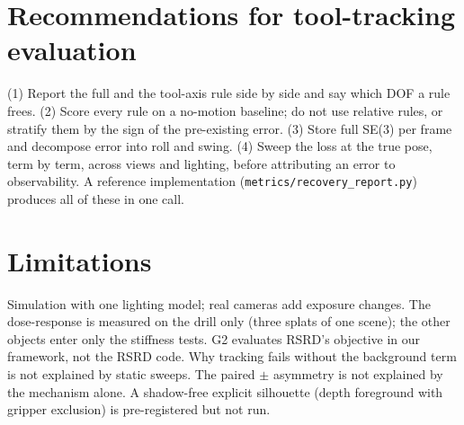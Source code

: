 \documentclass[conference]{IEEEtran}
\begin{document}
\section{Recommendations for tool-tracking evaluation}\label{sec:recs}
(1) Report the full and the tool-axis rule side by side and say which DOF a rule frees. (2) Score every rule on a
no-motion baseline; do not use relative rules, or stratify them by the sign of the pre-existing error. (3) Store
full SE(3) per frame and decompose error into roll and swing. (4) Sweep the loss at the true pose, term by term,
across views and lighting, before attributing an error to observability. A reference implementation
(\texttt{metrics/recovery\_report.py}) produces all of these in one call.

\section{Limitations}
Simulation with one lighting model; real cameras add exposure changes. The dose-response is measured on the drill
only (three splats of one scene); the other objects enter only the stiffness tests. G2 evaluates RSRD's objective in
our framework, not the RSRD code. Why tracking fails without the background term is not explained by static sweeps. The paired $\pm$
asymmetry is not explained by the mechanism alone. A shadow-free explicit silhouette (depth foreground with
gripper exclusion) is pre-registered but not run.



\end{document}

